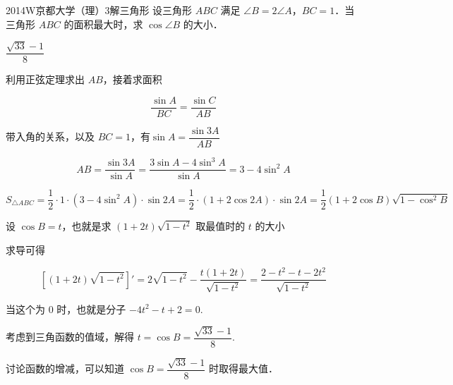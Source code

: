 
\begin{problem}{2014}{W}{京都大学（理）}{3}{解三角形}
设三角形 $ ABC $ 满足 $ \angle B = 2\angle A $，$ BC = 1 $．当三角形 $ ABC $ 的面积最大时，求 $ \cos\angle B $ 的大小．
\end{problem}

\begin{answer}
$ \dfrac{\sqrt{33}-1}{8} $
\end{answer}

\begin{solutions}
利用正弦定理求出 $ AB $，接着求面积

$$
\dfrac{\sin A}{BC} = \dfrac{\sin C}{AB}
$$

带入角的关系，以及 $ BC = 1 $，有$\sin A = \dfrac{\sin 3A}{AB}$

$$
AB = \dfrac{\sin 3A}{\sin A} = \dfrac{3\sin A - 4\sin^3 A}{\sin A} = 3 - 4\sin^2 A
$$

$$
S_{\triangle ABC} = \dfrac{1}{2} \cdot 1 \cdot (3 - 4\sin^2 A) \cdot \sin 2A
= \dfrac{1}{2} \cdot (1 + 2\cos 2A) \cdot \sin 2A
= \dfrac{1}{2}(1 + 2\cos B)\sqrt{1 - \cos^2 B}
$$

设 $ \cos B = t $，也就是求 $ (1 + 2t)\sqrt{1 - t^2} $ 取最值时的 $ t $ 的大小

求导可得

$$
\left[(1 + 2t)\sqrt{1 - t^2}\right]' = 2\sqrt{1 - t^2} - \dfrac{t(1 + 2t)}{\sqrt{1 - t^2}} = \dfrac{2 - t^2 - t - 2t^2}{\sqrt{1 - t^2}}
$$

当这个为 $ 0 $ 时，也就是分子 $ -4t^2 - t + 2 = 0 $.

考虑到三角函数的值域，解得 $ t = \cos B = \dfrac{\sqrt{33} - 1}{8} $.

讨论函数的增减，可以知道 $ \cos B = \dfrac{\sqrt{33} - 1}{8} $ 时取得最大值．
\end{solutions}